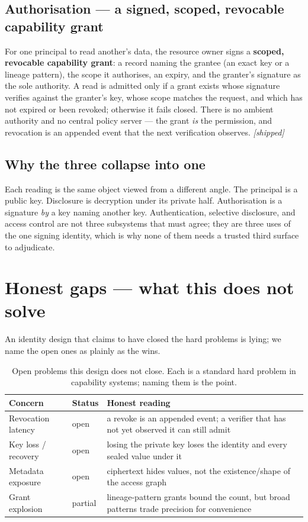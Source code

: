 \documentclass[11pt]{article}
\begin{document}
\subsection{Authorisation --- a signed, scoped, revocable capability grant}
For one principal to read another's data, the resource owner signs a \textbf{scoped,
revocable capability grant}: a record naming the grantee (an exact key or a lineage
pattern), the scope it authorises, an expiry, and the granter's signature as the
sole authority. A read is admitted only if a grant exists whose signature verifies
against the granter's key, whose scope matches the request, and which has not
expired or been revoked; otherwise it fails closed. There is no ambient authority
and no central policy server --- the grant \emph{is} the permission, and revocation
is an appended event that the next verification observes. \emph{[shipped]}

\subsection{Why the three collapse into one}
Each reading is the same object viewed from a different angle. The principal is a
public key. Disclosure is decryption under its private half. Authorisation is a
signature \emph{by} a key naming another key. Authentication, selective disclosure,
and access control are not three subsystems that must agree; they are three uses of
the one signing identity, which is why none of them needs a trusted third surface to
adjudicate.

\section{Honest gaps --- what this does not solve}
An identity design that claims to have closed the hard problems is lying; we name
the open ones as plainly as the wins.

\begin{table}[h]
\centering
\begin{tabular}{lll}
\toprule
Concern & Status & Honest reading \\
\midrule
Revocation latency & open & a revoke is an appended event; a verifier that has not
yet observed it can still admit \\
Key loss / recovery & open & losing the private key loses the identity and every
sealed value under it \\
Metadata exposure & open & ciphertext hides values, not the existence/shape of the
access graph \\
Grant explosion & partial & lineage-pattern grants bound the count, but broad
patterns trade precision for convenience \\
\bottomrule
\end{tabular}
\caption{Open problems this design does not close. Each is a standard hard problem
in capability systems; naming them is the point.}
\label{tab:gaps}
\end{table}
\end{document}
